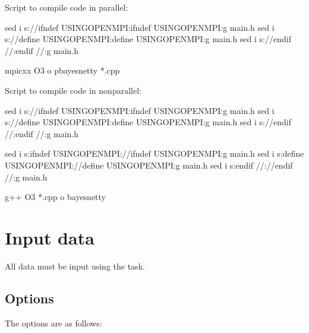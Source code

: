 \documentclass[letterpaper,10pt,english]{sphinxmanual}
\begin{document}
\sphinxAtStartPar
Script to compile code in parallel:

\begin{sphinxVerbatim}[commandchars=\\\{\}]
sed \PYGZhy{}i s://\PYGZsh{}ifndef\PYGZbs{} USING\PYGZus{}OPEN\PYGZus{}MPI:\PYGZsh{}ifndef\PYGZbs{} USING\PYGZus{}OPEN\PYGZus{}MPI:g main.h
sed \PYGZhy{}i s://\PYGZsh{}define\PYGZbs{} USING\PYGZus{}OPEN\PYGZus{}MPI:\PYGZsh{}define\PYGZbs{} USING\PYGZus{}OPEN\PYGZus{}MPI:g main.h
sed \PYGZhy{}i s://\PYGZsh{}endif\PYGZbs{} //:\PYGZsh{}endif\PYGZbs{} //:g main.h

mpicxx \PYGZhy{}O3 \PYGZhy{}o pbayesnetty *.cpp
\end{sphinxVerbatim}

\sphinxAtStartPar
Script to compile code in non\sphinxhyphen{}parallel:

\begin{sphinxVerbatim}[commandchars=\\\{\}]
sed \PYGZhy{}i s://\PYGZsh{}ifndef\PYGZbs{} USING\PYGZus{}OPEN\PYGZus{}MPI:\PYGZsh{}ifndef\PYGZbs{} USING\PYGZus{}OPEN\PYGZus{}MPI:g main.h
sed \PYGZhy{}i s://\PYGZsh{}define\PYGZbs{} USING\PYGZus{}OPEN\PYGZus{}MPI:\PYGZsh{}define\PYGZbs{} USING\PYGZus{}OPEN\PYGZus{}MPI:g main.h
sed \PYGZhy{}i s://\PYGZsh{}endif\PYGZbs{} //:\PYGZsh{}endif\PYGZbs{} //:g main.h

sed \PYGZhy{}i s:\PYGZsh{}ifndef\PYGZbs{} USING\PYGZus{}OPEN\PYGZus{}MPI://\PYGZsh{}ifndef\PYGZbs{} USING\PYGZus{}OPEN\PYGZus{}MPI:g main.h
sed \PYGZhy{}i s:\PYGZsh{}define\PYGZbs{} USING\PYGZus{}OPEN\PYGZus{}MPI://\PYGZsh{}define\PYGZbs{} USING\PYGZus{}OPEN\PYGZus{}MPI:g main.h
sed \PYGZhy{}i s:\PYGZsh{}endif\PYGZbs{} //://\PYGZsh{}endif\PYGZbs{} //:g main.h

g++ \PYGZhy{}O3 *.cpp \PYGZhy{}o bayesnetty
\end{sphinxVerbatim}

\sphinxstepscope


\section{Input data}
\label{\detokenize{input-data:input-data}}\label{\detokenize{input-data:id1}}\label{\detokenize{input-data::doc}}
\sphinxAtStartPar
All data must be input using the  task.


\subsection{Options}
\label{\detokenize{input-data:options}}\label{\detokenize{input-data:input-data-options}}
\sphinxAtStartPar
The options are as follows:
\end{document}
